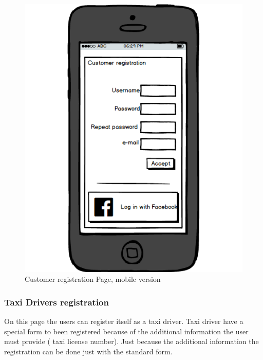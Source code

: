 \documentclass{report}
\begin{document}
				\begin{figure}[H]
					\centering
					\includegraphics[scale=0.4]{IMG/UserInterfaces/CustomerRegistration_m.png}
					\caption{Customer registration Page, mobile version}\label{visina8}
				\end{figure}
			
			\subsubsection{Taxi Drivers registration}
			On this page the users can register itself as a taxi driver. Taxi driver have a special form to been registered because of the additional information the user must provide ( taxi license 				number). Just because the additional information the registration can be done just with the standard form.
				
\end{document}
